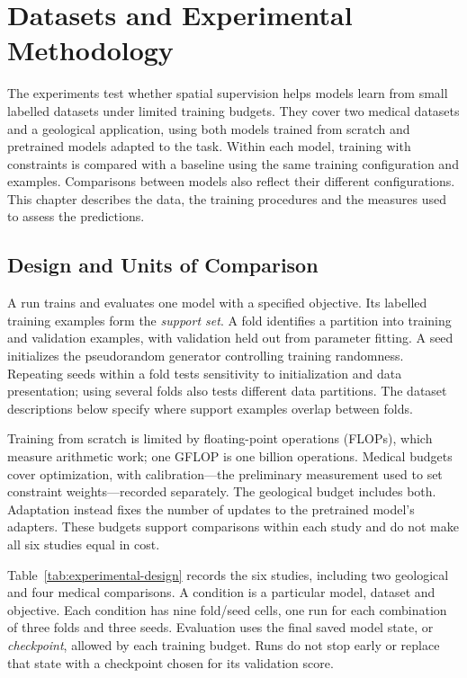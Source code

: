 \section{Datasets and Experimental Methodology}
\label{sec:methodology}

The experiments test whether spatial supervision helps models learn from
small labelled datasets under limited training budgets. They cover two
medical datasets and a geological application, using both models trained
from scratch and pretrained models adapted to the task. Within each model,
training with constraints is compared with a baseline using the same
training configuration and examples. Comparisons between models also
reflect their different configurations. This chapter describes the data,
the training procedures and the measures used to assess the predictions.

\subsection{Design and Units of Comparison}
\label{sec:experimental-structure}

A run trains and evaluates one model with a specified objective. Its
labelled training examples form the \emph{support set}. A fold identifies
a partition into training and validation examples, with validation held
out from parameter fitting. A seed initializes the pseudorandom generator
controlling training randomness. Repeating seeds within a fold tests
sensitivity to initialization and data presentation; using several folds
also tests different data partitions. The dataset descriptions below
specify where support examples overlap between folds.

Training from scratch is limited by floating-point operations (FLOPs),
which measure arithmetic work; one GFLOP is one billion operations.
Medical budgets cover optimization, with calibration---the preliminary
measurement used to set constraint weights---recorded separately. The
geological budget includes both. Adaptation instead fixes the number
of updates to the pretrained model's adapters. These budgets support
comparisons within each study and do not make all six studies equal in cost.

Table~\ref{tab:experimental-design} records the six studies, including two
geological and four medical comparisons. A condition is a particular model,
dataset and objective. Each condition has nine fold/seed cells, one run for
each combination of three folds and three seeds. Evaluation uses the
final saved model state, or \emph{checkpoint},
allowed by each training budget. Runs do not stop early or replace that
state with a checkpoint chosen for its validation score.

